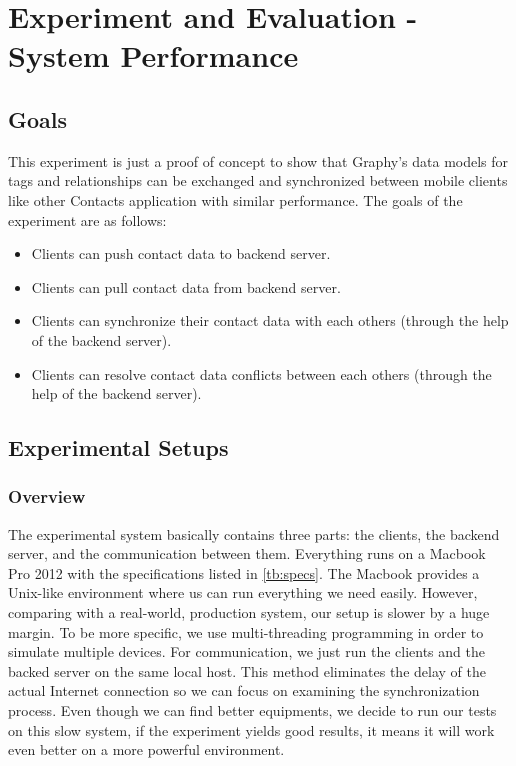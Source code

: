 \chapter{Experiment and Evaluation - System Performance}
\section{Goals}
This experiment is just a proof of concept to show that Graphy's data models for tags and relationships can be exchanged and synchronized between mobile clients like other Contacts application with similar performance. The goals of the experiment are as follows:

\begin{itemize}
    \item Clients can push contact data to backend server.
    \item Clients can pull contact data from backend server.
    \item Clients can synchronize their contact data with each others (through the help of the backend server).
    \item Clients can resolve contact data conflicts between each others (through the help of the backend server).
\end{itemize}

\section{Experimental Setups}
\subsection{Overview}
The experimental system basically contains three parts: the clients, the backend server, and the communication between them. Everything runs on a Macbook Pro 2012 with the specifications listed in \autoref{tb:specs}. The Macbook provides a Unix-like environment where us can run everything we need easily. However, comparing with a real-world, production system, our setup is slower by a huge margin. To be more specific, we use multi-threading programming in order to simulate multiple devices. For communication, we just run the clients and the backed server on the same local host. This method eliminates the delay of the actual Internet connection so we can focus on examining the synchronization process. Even though we can find better equipments, we decide to run our tests on this slow system, if the experiment yields good results, it means it will work even better on a more powerful environment.

